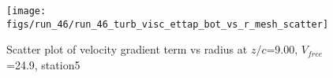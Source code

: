 \begin{figure}[H]
\centering
\texttt{[image: figs/run\_46/run\_46\_turb\_visc\_ettap\_bot\_vs\_r\_mesh\_scatter]}
\caption{Scatter plot of velocity gradient term vs radius at $z/c$=9.00, $V_{free}$=24.9, station5}
\label{fig:run_46_turb_visc_ettap_bot_vs_r_mesh_scatter}
\end{figure}


